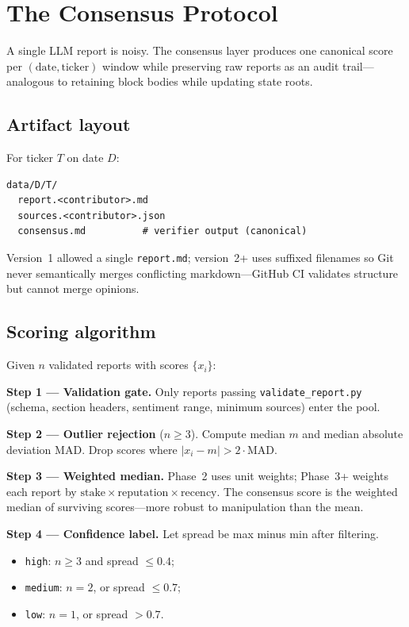 \documentclass[conference]{IEEEtran}
\begin{document}
\section{The Consensus Protocol}
\label{sec:consensus}

A single LLM report is noisy.
The consensus layer produces one canonical score per $(\text{date}, \text{ticker})$ window while preserving raw reports as an audit trail---analogous to retaining block bodies while updating state roots.

\subsection{Artifact layout}
For ticker $T$ on date $D$:
\begin{verbatim}
data/D/T/
  report.<contributor>.md
  sources.<contributor>.json
  consensus.md          # verifier output (canonical)
\end{verbatim}

Version~1 allowed a single \texttt{report.md}; version~2+ uses suffixed filenames so Git never semantically merges conflicting markdown---GitHub CI validates structure but cannot merge opinions.

\subsection{Scoring algorithm}
Given $n$ validated reports with scores $\{x_i\}$:

\textbf{Step 1 --- Validation gate.}
Only reports passing \texttt{validate\_report.py} (schema, section headers, sentiment range, minimum sources) enter the pool.

\textbf{Step 2 --- Outlier rejection} ($n \geq 3$).
Compute median $m$ and median absolute deviation $\text{MAD}$.
Drop scores where $|x_i - m| > 2 \cdot \text{MAD}$.

\textbf{Step 3 --- Weighted median.}
Phase~2 uses unit weights; Phase~3+ weights each report by $\text{stake} \times \text{reputation} \times \text{recency}$.
The consensus score is the weighted median of surviving scores---more robust to manipulation than the mean.

\textbf{Step 4 --- Confidence label.}
Let spread be max minus min after filtering.
\begin{itemize}
  \item \texttt{high}: $n \geq 3$ and spread $\leq 0.4$;
  \item \texttt{medium}: $n = 2$, or spread $\leq 0.7$;
  \item \texttt{low}: $n = 1$, or spread $> 0.7$.
\end{itemize}
\end{document}
